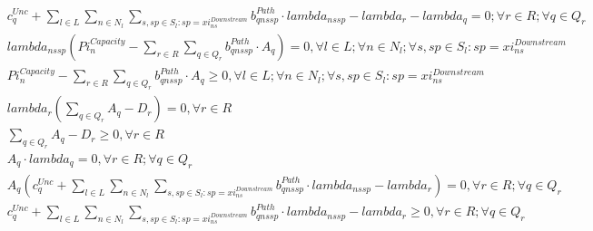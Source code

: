 \begin{align}
  & c_{q}^{U n c} + \underset{l \in \mathbf{\mathit{L}}}{\sum} \sum_{n \in \mathbf{\mathit{N}}_{l}} \sum_{s , sp \in \mathbf{\mathit{S}}_{l} : sp = \mathit{xi}_{\mathit{ns}}^{D o w n s t r e a m}} b_{\mathit{qns} sp}^{P a t h} \cdot \mathit{lambda}_{\mathit{ns} sp} - \mathit{lambda}_{r} - \mathit{lambda}_{q} = 0 ; \forall r \in \mathbf{\mathit{R}} ; \forall q \in \mathbf{\mathit{Q}}_{r} \tag{eq\_0054} \\
  & \mathit{lambda}_{\mathit{ns} sp} \left(\mathit{Pi}_{n}^{C a p a c i t y} - \sum_{r \in \mathbf{\mathit{R}}} \sum_{q \in \mathbf{\mathit{Q}}_{r}} b_{\mathit{qns} sp}^{P a t h} \cdot A_{q}\right) = 0 , \forall l \in \mathbf{\mathit{L}} ; \forall n \in \mathbf{\mathit{N}}_{l} ; \forall s , sp \in \mathbf{\mathit{S}}_{l} : sp = \mathit{xi}_{\mathit{ns}}^{D o w n s t r e a m} \tag{eq\_0055\_a} \\
  & \mathit{Pi}_{n}^{C a p a c i t y} - \sum_{r \in \mathbf{\mathit{R}}} \sum_{q \in \mathbf{\mathit{Q}}_{r}} b_{\mathit{qns} sp}^{P a t h} \cdot A_{q} \geq 0 , \forall l \in \mathbf{\mathit{L}} ; \forall n \in \mathbf{\mathit{N}}_{l} ; \forall s , sp \in \mathbf{\mathit{S}}_{l} : sp = \mathit{xi}_{\mathit{ns}}^{D o w n s t r e a m} \tag{eq\_0055\_c} \\
  & \mathit{lambda}_{r} \left(\sum_{q \in \mathbf{\mathit{Q}}_{r}} A_{q} - D_{r}\right) = 0 , \forall r \in \mathbf{\mathit{R}} \tag{eq\_0056\_a} \\
  & \sum_{q \in \mathbf{\mathit{Q}}_{r}} A_{q} - D_{r} \geq 0 , \forall r \in \mathbf{\mathit{R}} \tag{eq\_0056\_c} \\
  & A_{q} \cdot \mathit{lambda}_{q} = 0 , \forall r \in \mathbf{\mathit{R}} ; \forall q \in \mathbf{\mathit{Q}}_{r} \tag{eq\_0057\_a} \\
  & A_{q} \left(c_{q}^{U n c} + \sum_{l \in \mathbf{\mathit{L}}} \sum_{n \in \mathbf{\mathit{N}}_{l}} \sum_{s , sp \in \mathbf{\mathit{S}}_{l} : sp = \mathit{xi}_{\mathit{ns}}^{D o w n s t r e a m}} b_{\mathit{qns} sp}^{P a t h} \cdot \mathit{lambda}_{\mathit{ns} sp} - \mathit{lambda}_{r}\right) = 0 , \forall r \in \mathbf{\mathit{R}} ; \forall q \in \mathbf{\mathit{Q}}_{r} \tag{eq\_0058\_a} \\
  & c_{q}^{U n c} + \sum_{l \in \mathbf{\mathit{L}}} \sum_{n \in \mathbf{\mathit{N}}_{l}} \sum_{s , sp \in \mathbf{\mathit{S}}_{l} : sp = \mathit{xi}_{\mathit{ns}}^{D o w n s t r e a m}} b_{\mathit{qns} sp}^{P a t h} \cdot \mathit{lambda}_{\mathit{ns} sp} - \mathit{lambda}_{r} \geq 0 , \forall r \in \mathbf{\mathit{R}} ; \forall q \in \mathbf{\mathit{Q}}_{r} \tag{eq\_0058\_c} \\
\end{align}
